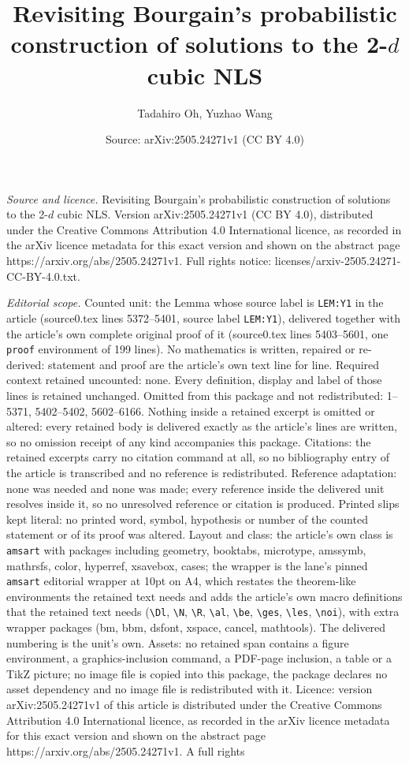 \documentclass[10pt,a4paper]{amsart}
\title[Revisiting Bourgain's probabilistic construction of solution]{Revisiting Bourgain's probabilistic construction of solutions to the 2-$d$ cubic NLS}
\author{Tadahiro Oh, Yuzhao Wang}
\date{Source: arXiv:2505.24271v1 (CC BY 4.0)}
\begin{document}
\maketitle

\noindent\emph{Source and licence.} Revisiting Bourgain's probabilistic construction of solutions to the 2-$d$ cubic NLS. Version arXiv:2505.24271v1 (CC BY 4.0), distributed under the Creative Commons Attribution 4.0 International licence, as recorded in the arXiv licence metadata for this exact version and shown on the abstract page https://arxiv.org/abs/2505.24271v1. Full rights notice: licenses/arxiv-2505.24271-CC-BY-4.0.txt.\par\smallskip

\noindent\textit{Editorial scope.} Counted unit: the Lemma whose source label is \texttt{LEM:Y1} in the article (source0.tex lines 5372--5401, source label \texttt{LEM:Y1}), delivered together with the article's own complete original proof of it (source0.tex lines 5403--5601, one \texttt{proof} environment of 199 lines). No mathematics is written, repaired or re-derived: statement and proof are the article's own text line for line. Required context retained uncounted: none. Every definition, display and label of those lines is retained unchanged. Omitted from this package and not redistributed: 1--5371, 5402--5402, 5602--6166. Nothing inside a retained excerpt is omitted or altered: every retained body is delivered exactly as the article's lines are written, so no omission receipt of any kind accompanies this package. Citations: the retained excerpts carry no citation command at all, so no bibliography entry of the article is transcribed and no reference is redistributed. Reference adaptation: none was needed and none was made; every reference inside the delivered unit resolves inside it, so no unresolved reference or citation is produced. Printed slips kept literal: no printed word, symbol, hypothesis or number of the counted statement or of its proof was altered. Layout and class: the article's own class is \texttt{amsart} with packages including geometry, booktabs, microtype, amssymb, mathrsfs, color, hyperref, xsavebox, cases; the wrapper is the lane's pinned \texttt{amsart} editorial wrapper at 10pt on A4, which restates the theorem-like environments the retained text needs and adds the article's own macro definitions that the retained text needs (\texttt{\textbackslash Dl}, \texttt{\textbackslash N}, \texttt{\textbackslash R}, \texttt{\textbackslash al}, \texttt{\textbackslash be}, \texttt{\textbackslash ges}, \texttt{\textbackslash les}, \texttt{\textbackslash noi}), with extra wrapper packages (bm, bbm, dsfont, xspace, cancel, mathtools). The delivered numbering is the unit's own. Assets: no retained span contains a figure environment, a graphics-inclusion command, a PDF-page inclusion, a table or a TikZ picture; no image file is copied into this package, the package declares no asset dependency and no image file is redistributed with it. Licence: version arXiv:2505.24271v1 of this article is distributed under the Creative Commons Attribution 4.0 International licence, as recorded in the arXiv licence metadata for this exact version and shown on the abstract page https://arxiv.org/abs/2505.24271v1. A full rights 
\end{document}
